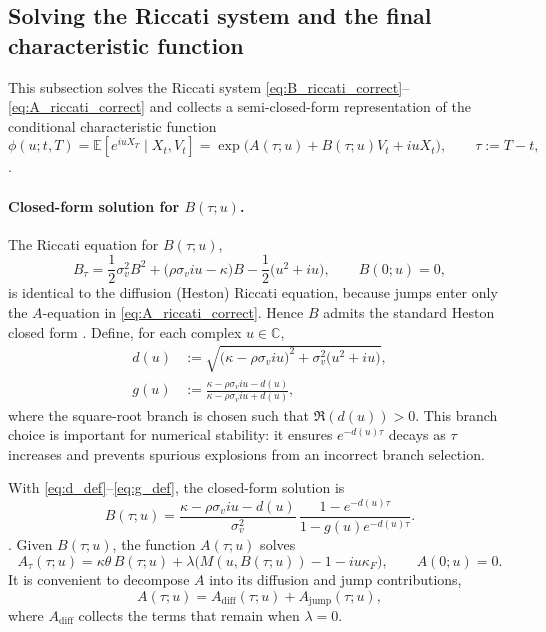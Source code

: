 \documentclass[a4paper,titlepage,12pt]{report}
\theoremstyle{plain}
\begin{document}
\subsection{Solving the Riccati system and the final characteristic function}\label{subsec:charfunc}

This subsection solves the Riccati system \eqref{eq:B_riccati_correct}--\eqref{eq:A_riccati_correct}
and collects a semi-closed-form representation of the conditional characteristic function
\[
\phi(u;t,T)=\mathbb{E}\!\left[e^{iuX_T}\mid X_t,V_t\right]
=
\exp\!\big(A(\tau;u)+B(\tau;u)V_t+iuX_t\big),
\qquad \tau:=T-t,
\].

\paragraph{Closed-form solution for $B(\tau;u)$.}
The Riccati equation for $B(\tau;u)$,
\[
B_\tau
=
\frac{1}{2}\sigma_v^2 B^2
+\big(\rho\sigma_v i u-\kappa\big)B
-\frac{1}{2}\big(u^2+i u\big),
\qquad B(0;u)=0,
\]
is identical to the diffusion (Heston) Riccati equation, because jumps enter only the $A$-equation in
\eqref{eq:A_riccati_correct}. Hence $B$ admits the standard Heston closed form \citep{Heston1993}.
Define, for each complex $u\in\mathbb{C}$,
\begin{align}
d(u) &:= \sqrt{\big(\kappa-\rho\sigma_v i u\big)^2 + \sigma_v^2\big(u^2+i u\big)}, \label{eq:d_def}\\
g(u) &:= \frac{\kappa-\rho\sigma_v i u - d(u)}{\kappa-\rho\sigma_v i u + d(u)}, \label{eq:g_def}
\end{align}
where the square-root branch is chosen such that $\Re(d(u))>0$. This branch choice is important for
numerical stability: it ensures $e^{-d(u)\tau}$ decays as $\tau$ increases and prevents spurious
explosions from an incorrect branch selection.

With \eqref{eq:d_def}--\eqref{eq:g_def}, the closed-form solution is
\begin{equation}
B(\tau;u)
=
\frac{\kappa-\rho\sigma_v i u - d(u)}{\sigma_v^2}\,
\frac{1-e^{-d(u)\tau}}{1-g(u)e^{-d(u)\tau}}.
\label{eq:B_closed}
\end{equation}.
Given $B(\tau;u)$, the function $A(\tau;u)$ solves
\[
A_\tau(\tau;u)
=
\kappa\theta\,B(\tau;u)
+\lambda\Big(M(u,B(\tau;u))-1-iu\kappa_F\Big),
\qquad A(0;u)=0.
\]
It is convenient to decompose $A$ into its diffusion and jump contributions,
\begin{equation}
A(\tau;u)=A_{\mathrm{diff}}(\tau;u)+A_{\mathrm{jump}}(\tau;u),
\label{eq:A_decomp}
\end{equation}
where $A_{\mathrm{diff}}$ collects the terms that remain when $\lambda=0$.
\end{document}
